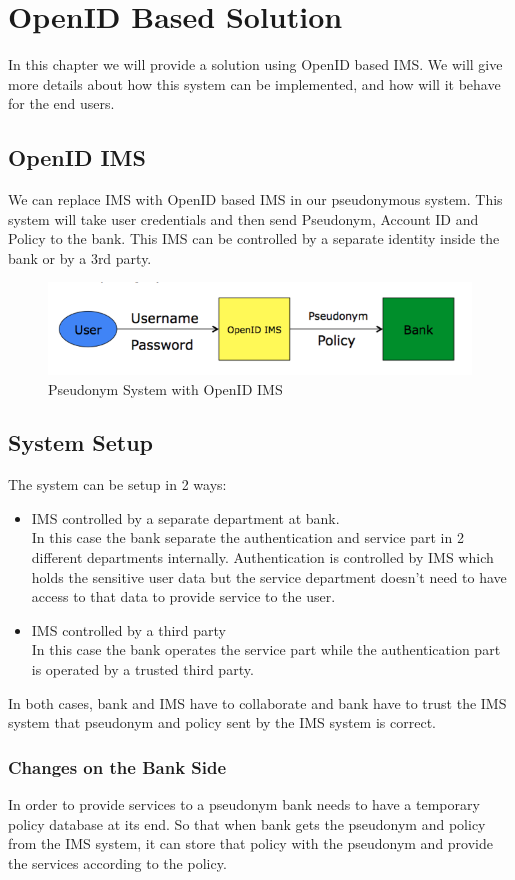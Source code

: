 \chapter{OpenID Based Solution}
In this chapter we will provide a solution using OpenID based IMS. We will give more details about how this system can be implemented, and how will it behave for the end users.
\section{OpenID IMS}
We can replace IMS with OpenID based IMS in our pseudonymous system. This system will take user credentials and then send Pseudonym, Account ID and Policy to the bank. This IMS can be controlled by a separate identity inside the bank or by a 3rd party.
\begin{figure}[h]
	\centering
	\includegraphics[width=\textwidth]{figures/OpenID}
	\caption{Pseudonym System with OpenID IMS}
	\label{fig:OpenID}
\end{figure}
\section{System Setup}
The system can be setup in 2 ways:
\begin{itemize}
	\item IMS controlled by a separate department at bank.\\
	In this case the bank separate the authentication and service part in 2 different departments internally. Authentication is controlled by IMS which holds the sensitive user data but the service department doesn't need to have access to that data to provide service to the user.
	\item IMS controlled by a third party\\
	In this case the bank operates the service part while the authentication part is operated by a trusted third party.
\end{itemize}
In both cases, bank and IMS have to collaborate and bank have to trust the IMS system that pseudonym and policy sent by the IMS system is correct.
\subsection{Changes on the Bank Side}
In order to provide services to a pseudonym bank needs to have a temporary policy database at its end. So that when bank gets the pseudonym and policy from the IMS system, it can store that policy with the pseudonym and provide the services according to the policy.
